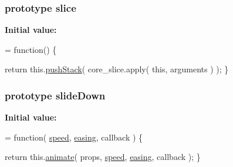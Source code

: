 \subsubsection[{slice}]{ {\bf prototype} slice}\label{jquery-1_810_82-vsdoc_8js_aea626f23fa5ea32b9d1c600d9c97d97d}
{\bfseries Initial value\+:}
\begin{DoxyCode}
= \textcolor{keyword}{function}() \{


        \textcolor{keywordflow}{return} this.\hyperlink{jquery-1_810_82-vsdoc_8js_afc3a7db1ef2b526338c06c07cecccd44}{pushStack}( core\_slice.apply( \textcolor{keyword}{this}, arguments ) );
    \}
\end{DoxyCode}
\hypertarget{jquery-1_810_82-vsdoc_8js_a9427ab906512c0f37fcb19a16acc9475}{}
\subsubsection[{slide\+Down}]{ {\bf prototype} slide\+Down}\label{jquery-1_810_82-vsdoc_8js_a9427ab906512c0f37fcb19a16acc9475}
{\bfseries Initial value\+:}
\begin{DoxyCode}
= \textcolor{keyword}{function}( \hyperlink{jquery-1_810_82-vsdoc_8js_add98c90065e6563cba26ff6d2016c46c}{speed}, \hyperlink{jquery-1_810_82-vsdoc_8js_a9758a312629fa6de1744280dd6e6253b}{easing}, callback ) \{


        \textcolor{keywordflow}{return} this.\hyperlink{jquery-1_810_82-vsdoc_8js_a956a1d08128d41115c45b6815814a64d}{animate}( props, \hyperlink{jquery-1_810_82-vsdoc_8js_add98c90065e6563cba26ff6d2016c46c}{speed}, \hyperlink{jquery-1_810_82-vsdoc_8js_a9758a312629fa6de1744280dd6e6253b}{easing}, callback );
    \}
\end{DoxyCode}
\hypertarget{jquery-1_810_82-vsdoc_8js_a01bfba7bb2f34bebc75afc052b8483bb}{}
